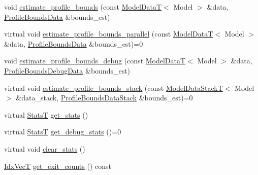 {\bf }\par
\begin{DoxyCompactItemize}
\item 
void \hyperlink{classmappel_1_1estimator_1_1Estimator_a9efcc3adb2fd64ab75c8954ab29687fc}{estimate\+\_\+profile\+\_\+bounds} (const \hyperlink{namespacemappel_a97f050df953605381ae9c901c3b125f1}{Model\+DataT}$<$ Model $>$ \&data, \hyperlink{structmappel_1_1estimator_1_1ProfileBoundsData}{Profile\+Bounds\+Data} \&bounds\+\_\+est)
\item 
virtual void \hyperlink{classmappel_1_1estimator_1_1Estimator_a6d68d18f228f610b02bbffbe4c7441e6}{estimate\+\_\+profile\+\_\+bounds\+\_\+parallel} (const \hyperlink{namespacemappel_a97f050df953605381ae9c901c3b125f1}{Model\+DataT}$<$ Model $>$ \&data, \hyperlink{structmappel_1_1estimator_1_1ProfileBoundsData}{Profile\+Bounds\+Data} \&bounds\+\_\+est)=0
\item 
void \hyperlink{classmappel_1_1estimator_1_1Estimator_a67b7910edb97973def5636ed01c3be5f}{estimate\+\_\+profile\+\_\+bounds\+\_\+debug} (const \hyperlink{namespacemappel_a97f050df953605381ae9c901c3b125f1}{Model\+DataT}$<$ Model $>$ \&data, \hyperlink{namespacemappel_1_1estimator_structmappel_1_1estimator_1_1ProfileBoundsDebugData}{Profile\+Bounds\+Debug\+Data} \&bounds\+\_\+est)
\item 
virtual void \hyperlink{classmappel_1_1estimator_1_1Estimator_a9c779bf059a6e93362c8aff55d225646}{estimate\+\_\+profile\+\_\+bounds\+\_\+stack} (const \hyperlink{namespacemappel_aaeb6665bc57476dd93c2df6ad8bc4768}{Model\+Data\+StackT}$<$ Model $>$ \&data\+\_\+stack, \hyperlink{structmappel_1_1estimator_1_1ProfileBoundsDataStack}{Profile\+Bounds\+Data\+Stack} \&bounds\+\_\+est)=0
\end{DoxyCompactItemize}

{\bf }\par
\begin{DoxyCompactItemize}
\item 
virtual \hyperlink{namespacemappel_a04ab395b0cf82c4ce68a36b2212649a5}{StatsT} \hyperlink{classmappel_1_1estimator_1_1Estimator_ab6ed2e8ffcfaa120b8020492f1c4d6e5}{get\+\_\+stats} ()
\item 
virtual \hyperlink{namespacemappel_a04ab395b0cf82c4ce68a36b2212649a5}{StatsT} \hyperlink{classmappel_1_1estimator_1_1Estimator_a0af782b7cdcd5272a372b24724a0bb07}{get\+\_\+debug\+\_\+stats} ()=0
\item 
virtual void \hyperlink{classmappel_1_1estimator_1_1Estimator_aa59f7b50317d4a32fcffe87979e0de63}{clear\+\_\+stats} ()
\item 
\hyperlink{namespacemappel_ac63743dcd42180127307cd0e4ecdd784}{Idx\+VecT} \hyperlink{classmappel_1_1estimator_1_1Estimator_adde56d397f57f6f4f2d4f10fc59f7a08}{get\+\_\+exit\+\_\+counts} () const 
\end{DoxyCompactItemize}

